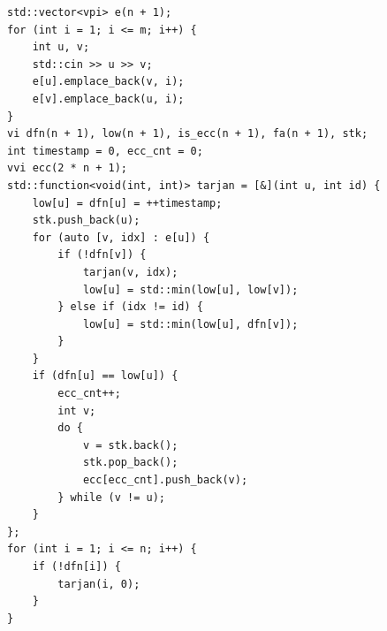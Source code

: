 \documentclass[UTF8, a4paper, titlepage, twoside]{ctexart}
\begin{document}
\begin{lstlisting}[style=cpp]
std::vector<vpi> e(n + 1);
for (int i = 1; i <= m; i++) {
    int u, v;
    std::cin >> u >> v;
    e[u].emplace_back(v, i);
    e[v].emplace_back(u, i);
}
vi dfn(n + 1), low(n + 1), is_ecc(n + 1), fa(n + 1), stk;
int timestamp = 0, ecc_cnt = 0;
vvi ecc(2 * n + 1);
std::function<void(int, int)> tarjan = [&](int u, int id) {
    low[u] = dfn[u] = ++timestamp;
    stk.push_back(u);
    for (auto [v, idx] : e[u]) {
        if (!dfn[v]) {
            tarjan(v, idx);
            low[u] = std::min(low[u], low[v]);
        } else if (idx != id) {
            low[u] = std::min(low[u], dfn[v]);
        }
    }
    if (dfn[u] == low[u]) {
        ecc_cnt++;
        int v;
        do {
            v = stk.back();
            stk.pop_back();
            ecc[ecc_cnt].push_back(v);
        } while (v != u);
    }
};
for (int i = 1; i <= n; i++) {
    if (!dfn[i]) {
        tarjan(i, 0);
    }
}
\end{lstlisting}
\end{document}
